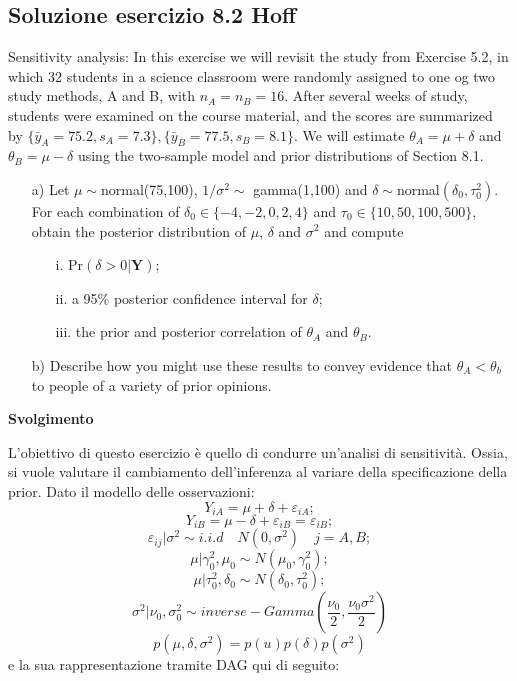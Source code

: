 \subsection{Soluzione esercizio 8.2 Hoff}

Sensitivity analysis: In this exercise we will revisit the study from Exercise 5.2, in which 32 students in a science classroom were randomly assigned to one og two study methods, A and B, with $n_A = n_B = 16$. After several weeks of study, students were examined on the course material, and the scores are summarized by $\{\bar{y}_A = 75.2, s_A = 7.3\}, \{\bar{y}_B = 77.5, s_B = 8.1\}$. We will estimate $\theta_A = \mu+\delta$ and $\theta_B = \mu-\delta$ using the two-sample model and prior distributions of Section 8.1.
\begin{itemize}
	\item[a)] Let $\mu \sim $normal(75,100),  $1/\sigma^2\sim$ gamma(1,100) and $\delta\sim$normal$(\delta_0, \tau^2_0)$. For each combination of $\delta_0 \in \{-4, -2, 0, 2, 4\}$ and $\tau_0 \in \{10, 50, 100, 500\}$, obtain the posterior distribution of $\mu$, $\delta$ and $\sigma^2$ and compute
	\begin{itemize}
		\item[i.] Pr$(\delta>0|\boldsymbol{Y})$;
		\item[ii.] a 95$\%$ posterior confidence interval for $\delta$;
		\item[iii.] the prior and posterior correlation of $\theta_A$ and $\theta_B$.
	\end{itemize}
	\item[b)] Describe how you might use these results to convey evidence that $\theta_A<\theta_b$ to people of a variety of prior opinions.
\end{itemize}

\textbf{Svolgimento}
\bigskip

L'obiettivo di questo esercizio è quello di condurre un'analisi di sensitività. 
Ossia, si vuole valutare il cambiamento dell'inferenza al variare della specifica\-zione della prior. 
Dato il modello delle osservazioni:
\[
Y_{iA} = \mu + \delta + \varepsilon_{iA};
\]
\[
Y_{iB} = \mu - \delta + \varepsilon_{iB} = \varepsilon_{iB};
\]
\[
\varepsilon_{ij} | \sigma^2 \sim i.i.d \quad N(0,\sigma^2) \quad j = A,B;
\]
\[
\mu|\gamma_0^2,\mu_0 \sim N(\mu_0,\gamma_0^2);
\]
\[
\mu|\tau_0^2,\delta_0 \sim N(\delta_0,\tau_0^2);
\]
\[
\sigma^2 | \nu_0,\sigma_0^2 \sim inverse-Gamma(\frac{\nu_0}{2},\frac{\nu_0\sigma^2}{2})
\]
\[
p(\mu,\delta,\sigma^2) = p(u)p(\delta)p(\sigma^2)
\]
e la sua rappresentazione tramite DAG qui di seguito:

